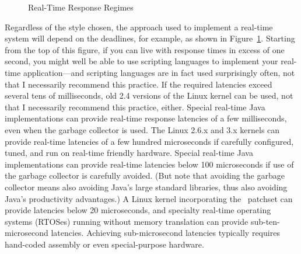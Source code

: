 \begin{figure}[tb]
\centering
{}
\caption{Real-Time Response Regimes}
\label{fig:advsync:Real-Time Response Regimes}
\end{figure}

Regardless of the style chosen, the approach used to implement a real-time
system will depend on the deadlines, for example, as shown in
Figure~\ref{fig:advsync:Real-Time Response Regimes}.
Starting from the top of this figure, if you can live with response times in
excess of one second, you might well be able to use scripting languages
to implement your real-time application---and scripting languages are
in fact used surprisingly often, not that I necessarily recommend this
practice.
If the required latencies exceed several tens of milliseconds,
old 2.4 versions of the Linux kernel can be used, not that I necessarily
recommend this practice, either.
Special real-time Java implementations can provide real-time response
latencies of a few milliseconds, even when the garbage collector is
used.
The Linux 2.6.x and 3.x kernels can provide real-time latencies of
a few hundred microseconds if carefully configured, tuned, and run
on real-time friendly hardware.
Special real-time Java implementations can provide real-time latencies
below 100 microseconds if use of the garbage collector is carefully avoided.
(But note that avoiding the garbage collector means also avoiding
Java's large standard libraries, thus also avoiding Java's productivity
advantages.)
A Linux kernel incorporating the \rt\ patchset can provide latencies
below 20 microseconds, and specialty real-time operating systems (RTOSes)
running without memory translation can provide sub-ten-microsecond
latencies.
Achieving sub-microsecond latencies typically requires hand-coded assembly
or even special-purpose hardware.

